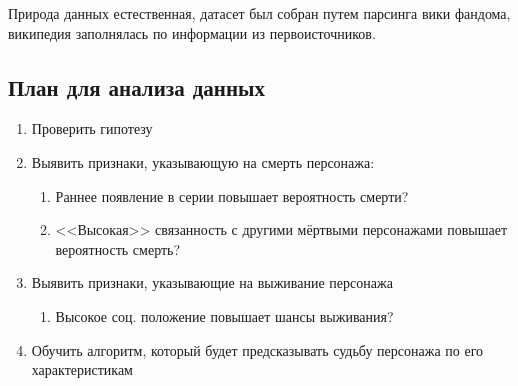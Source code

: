 		Природа данных естественная, датасет был собран путем парсинга вики фандома, википедия заполнялась по информации из первоисточников.
	
	\subsection{План для анализа данных}
		\begin{enumerate}
			\item Проверить гипотезу
			\item Выявить признаки, указывающую на смерть персонажа:
			\begin{enumerate}
				\item Раннее появление в серии повышает вероятность смерти?
				\item <<Высокая>> связанность с другими мёртвыми персонажами повышает вероятность смерть?
			\end{enumerate}
			\item Выявить признаки, указывающие на выживание персонажа
			\begin{enumerate}
				\item Высокое соц. положение повышает шансы выживания?
			\end{enumerate}
			\item Обучить алгоритм, который будет предсказывать судьбу персонажа по его характеристикам
		\end{enumerate}
